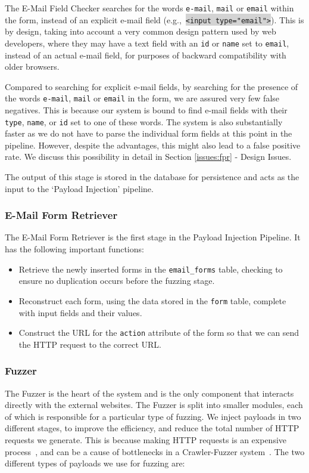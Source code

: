 The E-Mail Field Checker searches for the words \texttt{e-mail}, \texttt{mail} or \texttt{email} within the form, instead of an explicit e-mail field (e.g.,\ \colorbox{lightgray}{\lstinline{<input type="email">}}). This is by design, taking into account a very common design pattern used by web developers, where they may have a text field with an \texttt{id} or \texttt{name} set to \texttt{email}, instead of an actual e-mail field, for purposes of backward compatibility with older browsers.

Compared to searching for explicit e-mail fields, by searching for the presence of the words \texttt{e-mail}, \texttt{mail} or \texttt{email} in the form, we are assured very few false negatives. This is because our system is bound to find e-mail fields with their \texttt{type}, \texttt{name}, or \texttt{id} set to one of these words. The system is also substantially faster as we do not have to parse the individual form fields at this point in the pipeline. However, despite the advantages, this might also lead to a false positive rate. We discuss this possibility in detail in Section \ref*{issues:fpr} - Design Issues. 

The output of this stage is stored in the database for persistence and acts as the input to the `Payload Injection' pipeline.


\subsubsection{E-Mail Form Retriever}
\label{Comp:EMFR}
The E-Mail Form Retriever is the first stage in the Payload Injection Pipeline. It has the following important functions:
\begin{itemize}
	\item Retrieve the newly inserted forms in the \texttt{email\_forms} table, checking to ensure no duplication occurs before the fuzzing stage.
	\item Reconstruct each form, using the data stored in the \texttt{form} table, complete with input fields and their values.
	\item Construct the URL for the \texttt{action} attribute of the form so that we can send the HTTP request to the correct URL. 
\end{itemize}

\subsubsection{Fuzzer}
\label{Comp:Fuzzer}
The Fuzzer is the heart of the system and is the only component that interacts directly with the external websites. The Fuzzer is split into smaller modules, each of which is responsible for a particular type of fuzzing.  We inject payloads in two different stages, to improve the efficiency, and reduce the total number of HTTP requests we generate. This is because making HTTP requests is an expensive process~\cite{McGrath2009}, and can be a cause of bottlenecks in a Crawler-Fuzzer system~\cite{ShkapenyukTorstenSuel2001}.
The two different types of payloads we use for fuzzing are:
